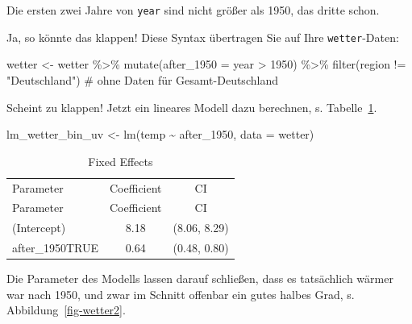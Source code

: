\documentclass[
  letterpaper,
  twoside,
  open=any]{scrbook}
\newenvironment{Shaded}{\begin{snugshade}}{\end{snugshade}}
\newcommand{\AttributeTok}[1]{\textcolor[rgb]{0.40,0.45,0.13}{#1}}
\newcommand{\CommentTok}[1]{\textcolor[rgb]{0.37,0.37,0.37}{#1}}
\newcommand{\DecValTok}[1]{\textcolor[rgb]{0.68,0.00,0.00}{#1}}
\newcommand{\FunctionTok}[1]{\textcolor[rgb]{0.28,0.35,0.67}{#1}}
\newcommand{\NormalTok}[1]{\textcolor[rgb]{0.00,0.23,0.31}{#1}}
\newcommand{\OtherTok}[1]{\textcolor[rgb]{0.00,0.23,0.31}{#1}}
\newcommand{\SpecialCharTok}[1]{\textcolor[rgb]{0.37,0.37,0.37}{#1}}
\newcommand{\StringTok}[1]{\textcolor[rgb]{0.13,0.47,0.30}{#1}}
\theoremstyle{definition}
\theoremstyle{definition}
\theoremstyle{definition}
\theoremstyle{remark}
\begin{document}
Die ersten zwei Jahre von \texttt{year} sind nicht größer als 1950, das
dritte schon.

Ja, so könnte das klappen! Diese Syntax übertragen Sie auf Ihre
\texttt{wetter}-Daten:

\begin{Shaded}
\begin{Highlighting}[]
\NormalTok{wetter }\OtherTok{\textless{}{-}}
\NormalTok{  wetter }\SpecialCharTok{\%\textgreater{}\%} 
  \FunctionTok{mutate}\NormalTok{(}\AttributeTok{after\_1950 =}\NormalTok{ year }\SpecialCharTok{\textgreater{}} \DecValTok{1950}\NormalTok{) }\SpecialCharTok{\%\textgreater{}\%} 
  \FunctionTok{filter}\NormalTok{(region }\SpecialCharTok{!=} \StringTok{"Deutschland"}\NormalTok{)  }\CommentTok{\# ohne Daten für Gesamt{-}Deutschland}
\end{Highlighting}
\end{Shaded}

Scheint zu klappen! Jetzt ein lineares Modell dazu berechnen, s.
Tabelle~\ref{tbl-lm-wetter-bin-uv}.

\begin{Shaded}
\begin{Highlighting}[]
\NormalTok{lm\_wetter\_bin\_uv }\OtherTok{\textless{}{-}} \FunctionTok{lm}\NormalTok{(temp }\SpecialCharTok{\textasciitilde{}}\NormalTok{ after\_1950, }\AttributeTok{data =}\NormalTok{ wetter)}
\end{Highlighting}
\end{Shaded}

\begin{longtable}[]{@{}lcc@{}}

\caption{\label{tbl-lm-wetter-bin-uv}Parameter von
\texttt{lm\_wetter\_bin\_uv}}

\tabularnewline

\caption{Fixed Effects}\tabularnewline
\toprule\noalign{}
Parameter & Coefficient & CI \\
\midrule\noalign{}
\endfirsthead
\toprule\noalign{}
Parameter & Coefficient & CI \\
\midrule\noalign{}
\endhead
\bottomrule\noalign{}
\endlastfoot
(Intercept) & 8.18 & (8.06, 8.29) \\
after\_1950TRUE & 0.64 & (0.48, 0.80) \\

\end{longtable}

Die Parameter des Modells lassen darauf schließen, dass es tatsächlich
wärmer war nach 1950, und zwar im Schnitt offenbar ein gutes halbes
Grad, s. Abbildung~\ref{fig-wetter2}.
\end{document}
